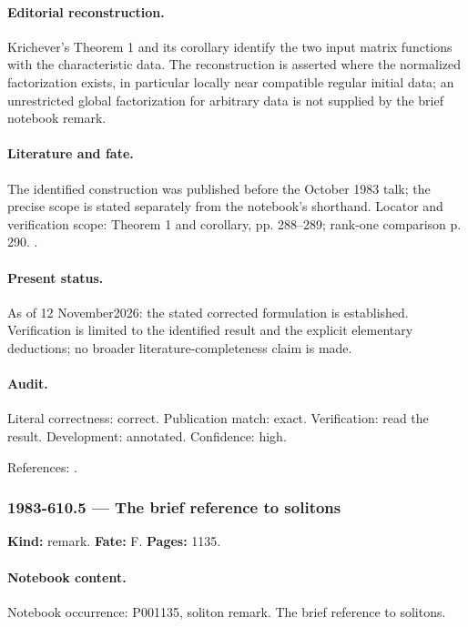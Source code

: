 \paragraph{Editorial reconstruction.} Krichever's Theorem 1 and its corollary identify the two input matrix functions with the characteristic data. The reconstruction is asserted where the normalized factorization exists, in particular locally near compatible regular initial data; an unrestricted global factorization for arbitrary data is not supplied by the brief notebook remark.

\paragraph{Literature and fate.} The identified construction was published before the October 1983 talk; the precise scope is stated separately from the notebook's shorthand. Locator and verification scope: Theorem 1 and corollary, pp. 288--289; rank-one comparison p. 290. \cite{krichever1980dalembert}.

\paragraph{Present status.} As of 12 November2026: the stated corrected formulation is established. Verification is limited to the identified result and the explicit elementary deductions; no broader literature-completeness claim is made.

\paragraph{Audit.} Literal correctness: correct. Publication match: exact. Verification: read the result. Development: annotated. Confidence: high.

\noindent References: \citep{krichever1980dalembert}.\par

\subsubsection{1983-610.5 --- The brief reference to solitons}

\label{item:1983-610.5}

\noindent\textbf{Kind:} remark. \textbf{Fate:} F. \textbf{Pages:} 1135.\par

\paragraph{Notebook content.} Notebook occurrence: P001135, soliton remark. The brief reference to solitons.

